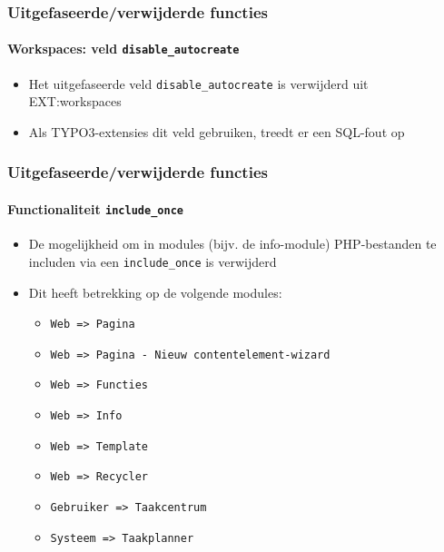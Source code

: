 \begin{frame}[fragile]
	\frametitle{Uitgefaseerde/verwijderde functies}
	\framesubtitle{Workspaces: veld \texttt{disable\_autocreate}}

	\begin{itemize}
		\item Het uitgefaseerde veld \texttt{disable\_autocreate} is verwijderd uit EXT:workspaces
		\item Als TYPO3-extensies dit veld gebruiken, treedt er een SQL-fout op
	\end{itemize}

\end{frame}


\begin{frame}[fragile]
	\frametitle{Uitgefaseerde/verwijderde functies}
	\framesubtitle{Functionaliteit \texttt{include\_once}}

	\begin{itemize}

		\item De mogelijkheid om in modules (bijv. de info-module) PHP-bestanden
			 te includen via een \texttt{include\_once} is verwijderd

		\item Dit heeft betrekking op de volgende modules:

			\begin{itemize}
				\item \texttt{Web => Pagina}
				\item \texttt{Web => Pagina - Nieuw contentelement-wizard}
				\item \texttt{Web => Functies}
				\item \texttt{Web => Info}
				\item \texttt{Web => Template}
				\item \texttt{Web => Recycler}
				\item \texttt{Gebruiker => Taakcentrum}
				\item \texttt{Systeem => Taakplanner}
			\end{itemize}

	\end{itemize}

\end{frame}

